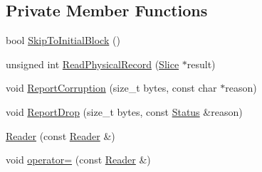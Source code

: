 \subsection*{Private Member Functions}
\begin{DoxyCompactItemize}
\item 
bool \hyperlink{classleveldb_1_1log_1_1_reader_ae11273725f413d19be1087f221a48ac7}{Skip\+To\+Initial\+Block} ()
\item 
unsigned int \hyperlink{classleveldb_1_1log_1_1_reader_a001a5d7b4f3cc86c29fc2b0d31a52c27}{Read\+Physical\+Record} (\hyperlink{classleveldb_1_1_slice}{Slice} $\ast$result)
\item 
void \hyperlink{classleveldb_1_1log_1_1_reader_a9ac87fa07d90bf350d2bbbacc3265931}{Report\+Corruption} (size\+\_\+t bytes, const char $\ast$reason)
\item 
void \hyperlink{classleveldb_1_1log_1_1_reader_afadf9a8b44005fd8e9fc798d35befb50}{Report\+Drop} (size\+\_\+t bytes, const \hyperlink{classleveldb_1_1_status}{Status} \&reason)
\item 
\hyperlink{classleveldb_1_1log_1_1_reader_a46b247c0cd5cb07a7304b991910f9f98}{Reader} (const \hyperlink{classleveldb_1_1log_1_1_reader}{Reader} \&)
\item 
void \hyperlink{classleveldb_1_1log_1_1_reader_a4afbb16aaea6a11a8be624b5d425b8a7}{operator=} (const \hyperlink{classleveldb_1_1log_1_1_reader}{Reader} \&)
\end{DoxyCompactItemize}
